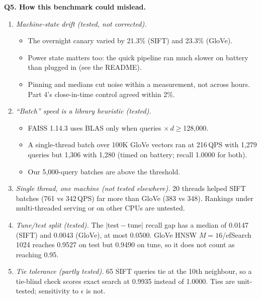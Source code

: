 \documentclass[10pt,twocolumn]{article}
\begin{document}
\textbf{Q5. How this benchmark could mislead.}
\begin{enumerate}
\item \emph{Machine-state drift (tested, not corrected).}
  \begin{itemize}
  \item The overnight canary varied by 21.3\% (SIFT) and 23.3\% (GloVe).
  \item Power state matters too: the quick pipeline ran much slower on battery than plugged in
    (see the README).
  \item Pinning and medians cut noise within a measurement, not across hours. Part 4's
    close-in-time control agreed within 2\%.
  \end{itemize}
\item \emph{``Batch'' speed is a library heuristic (tested).}
  \begin{itemize}
  \item FAISS 1.14.3 uses BLAS only when queries $\times\,d\ge$128,000.
  \item A single-thread batch over 100K GloVe vectors ran at 216\,QPS with 1,279 queries but
    1,306 with 1,280 (timed on battery; recall 1.0000 for both).
  \item Our 5,000-query batches are above the threshold.
  \end{itemize}
\item \emph{Single thread, one machine (not tested elsewhere).} 20 threads helped SIFT batches
  (761 vs 342\,QPS) far more than GloVe (383 vs 348). Rankings under multi-threaded serving or on
  other CPUs are untested.
\item \emph{Tune/test split (tested).} The $|$test${}-{}$tune$|$ recall gap has a median of
  0.0147 (SIFT) and 0.0043 (GloVe), at most 0.0500. GloVe HNSW $M{=}16$/efSearch 1024 reaches
  0.9527 on test but 0.9490 on tune, so it does not count as reaching 0.95.
\item \emph{Tie tolerance (partly tested).} 65 SIFT queries tie at the 10th neighbour, so a
  tie-blind check scores exact search at 0.9935 instead of 1.0000. Ties are unit-tested;
  sensitivity to $\epsilon$ is not.
\end{enumerate}
\end{document}
